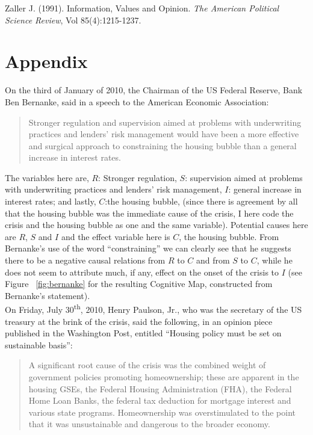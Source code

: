 \documentclass[12pt]{article}
\newcommand{\ts}{\textsuperscript}
\begin{document}

Zaller J. (1991). Information, Values and Opinion. \textit{The American Political Science Review}, Vol 85(4):1215-1237.


\section*{Appendix}
On the third of January of 2010, the Chairman of the US Federal Reserve, Bank Ben Bernanke, said in a speech to the American Economic Association:
\begin{quotation}
Stronger regulation and supervision aimed at problems with underwriting practices and lenders' risk management would have been a more effective and surgical approach to constraining the housing bubble than a  general increase in interest rates.
\end{quotation}

The variables here are, $R$: Stronger regulation, $S$: supervision aimed at problems with underwriting practices and lenders' risk management, $I$: general increase in interest rates; and lastly, $C$:the housing bubble, (since there is agreement by all that the housing bubble was the immediate cause of the crisis, I here code the crisis and the housing bubble as one and the same variable). Potential causes here are $R$, $S$ and $I$ and the effect variable here is $C$, the housing bubble. From Bernanke's use of the word ``constraining'' we can clearly see that he suggests there to be a negative causal relations from $R$ to $C$ and from $S$ to $C$, while he does not seem to attribute much, if any, effect on the onset of the crisis to $I$ (see Figure ~\ref{fig:bernanke} for the resulting Cognitive Map, constructed from Bernanke's statement).\\

On Friday, July 30\ts{th}, 2010, Henry Paulson, Jr., who was the secretary of the US treasury at the brink of the crisis, said the following, in an opinion piece published in the Washington Post, entitled ``Housing policy must be set on sustainable basis'':

\begin{quotation}
A significant root cause of the crisis was the combined weight of government policies promoting homeownership; these are apparent in the housing GSEs, the Federal Housing Administration (FHA), the Federal Home Loan Banks, the federal tax deduction for mortgage interest and various state programs. Homeownership was overstimulated to the point that it was unsustainable and dangerous to the broader economy.
\end{quotation}
\end{document}
